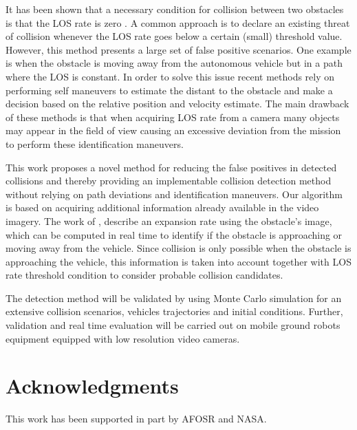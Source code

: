 \documentclass[]{aiaa-tc}%
\begin{document}
It has been shown that a necessary condition for collision between two obstacles is that the LOS rate is zero \cite{kochenderfer2008hazard}. A common approach is to declare an existing threat of collision whenever the LOS rate goes below a certain (small) threshold value. However, this method presents a large set of false positive scenarios. One example is when the obstacle is moving away from the autonomous vehicle but in a path where the LOS is constant. In order to solve this issue recent methods rely on performing self maneuvers \cite{kochenderfer2008hazard} to estimate the distant to the obstacle and make a decision based on the relative position and velocity estimate. The main drawback of these methods is that when acquiring LOS rate from a camera many objects may appear in the field of view causing an excessive deviation from the mission to perform these identification maneuvers. %

This work proposes a novel method for reducing the false positives in detected collisions and thereby providing an implementable collision detection method without relying on path deviations and identification maneuvers. Our algorithm is based on acquiring additional information already available in the video imagery. The work of \cite{lee1976theory},\cite{lee1980optic} describe an expansion rate using the obstacle’s image, which can be computed in real time to identify if the obstacle is approaching or moving away from the vehicle. Since collision is only possible when the obstacle is approaching the vehicle, this information is taken into account together with LOS rate threshold condition to consider probable collision candidates.

The detection method will be validated by using Monte Carlo simulation for an extensive collision scenarios, vehicles trajectories and initial conditions. Further, validation and real time evaluation will be carried out on mobile ground robots equipment equipped with low resolution video cameras.
\section{Acknowledgments}
\label{sec:Acknowledgments}
This work has been supported in part by AFOSR and NASA.



\end{document}
